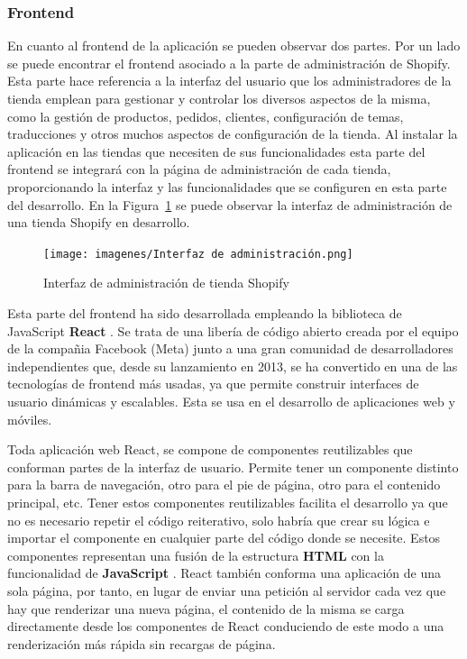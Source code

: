 \documentclass[12pt]{article}
\begin{document}
\subsubsection{Frontend}
En cuanto al frontend de la aplicación se pueden observar dos partes. 
Por un lado se puede encontrar el frontend asociado a la parte de administración de Shopify. 
Esta parte hace referencia a la interfaz del usuario que los administradores de la tienda emplean para gestionar y controlar los diversos aspectos de
la misma, como la gestión de productos, pedidos, clientes, configuración de temas, traducciones y otros muchos aspectos de configuración de la tienda.
Al instalar la aplicación en las tiendas que necesiten de sus funcionalidades esta parte del frontend se integrará con la página de administración de 
cada tienda, proporcionando la interfaz y las funcionalidades que se configuren en esta parte del desarrollo. En la Figura~\ref{fig:1} se puede observar la 
interfaz de administración de una tienda Shopify en desarrollo.

\begin{figure}[ht]
    \centering
    \texttt{[image: imagenes/Interfaz de administración.png]}
    \caption{\label{fig:1}Interfaz de administración de tienda Shopify}
    \vspace{\fill}
\end{figure}

Esta parte del frontend ha sido desarrollada empleando la biblioteca de JavaScript \textbf{React} \cite{react-pag-1}. Se trata de una libería de código abierto creada por el equipo de la
compañia Facebook (Meta) junto a una gran comunidad de desarrolladores independientes que, desde su lanzamiento en 2013, se ha convertido en una
de las tecnologías de frontend más usadas, ya que permite construir interfaces de usuario dinámicas y escalables. Esta se usa en el desarrollo de aplicaciones web y móviles. 

Toda aplicación web React, se compone de componentes reutilizables que conforman partes de la interfaz de usuario. Permite tener un componente distinto para
la barra de navegación, otro para el pie de página, otro para el contenido principal, etc.
Tener estos componentes reutilizables facilita el desarrollo ya que no es necesario repetir el código reiterativo, solo habría que crear su lógica e
importar el componente en cualquier parte del código donde se necesite. Estos componentes representan una fusión de la estructura \textbf{HTML} \cite{html} con la funcionalidad de \textbf{JavaScript} \cite{javascript}.
React también conforma una aplicación de una sola página, por tanto, en lugar de enviar una petición al servidor cada vez que hay que renderizar una nueva página,
el contenido de la misma se carga directamente desde los componentes de React conduciendo de este modo a una renderización más rápida sin recargas de página. \cite{react-pag-2}
\end{document}
